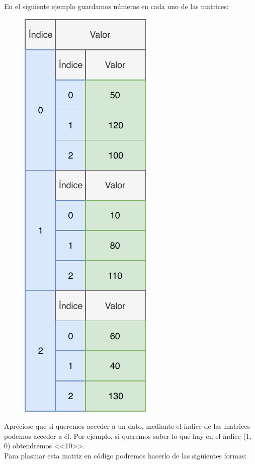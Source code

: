 \documentclass[11pt, oneside]{book}		%
\begin{document}
		En el siguiente ejemplo guardamos números en cada uno de las matrices:
		\begin{figure}[H]
			\centering
			\includegraphics{img/TiposEnumerables/Matriz/array4.pdf}
		\end{figure} 
		Apréciese que si queremos acceder a un dato, mediante el índice de las matrices podemos acceder a él. Por ejemplo, si queremos saber lo que hay en el índice (1, 0) obtendremos <<10>>.\\
		Para plasmar esta matriz en código podremos hacerlo de las siguientes formas:
		\\\\\begin{minipage}[c]{0.95\textwidth}
			
		\end{minipage}
\end{document}
